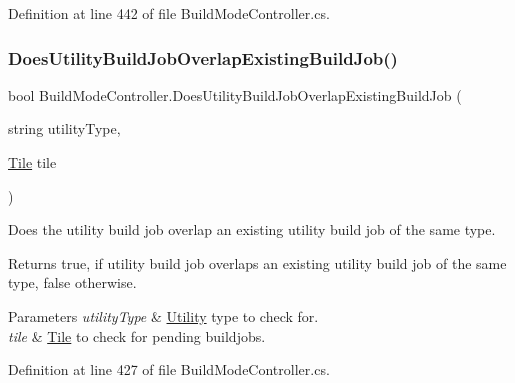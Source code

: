 Definition at line 442 of file Build\+Mode\+Controller.\+cs.

\mbox{\label{class_build_mode_controller_a701cb5c8326af048f78a511cf7c1c190}} 
\subsubsection{\texorpdfstring{Does\+Utility\+Build\+Job\+Overlap\+Existing\+Build\+Job()}{DoesUtilityBuildJobOverlapExistingBuildJob()}}
{\footnotesize\ttfamily bool Build\+Mode\+Controller.\+Does\+Utility\+Build\+Job\+Overlap\+Existing\+Build\+Job (\begin{DoxyParamCaption}\item[{string}]{utility\+Type,  }\item[{\hyperlink{class_tile}{Tile}}]{tile }\end{DoxyParamCaption})}



Does the utility build job overlap an existing utility build job of the same type. 

\begin{DoxyReturn}{Returns}
{\ttfamily true}, if utility build job overlaps an existing utility build job of the same type, {\ttfamily false} otherwise.
\end{DoxyReturn}

\begin{DoxyParams}{Parameters}
{\em utility\+Type} & \hyperlink{class_utility}{Utility} type to check for.\\
\hline
{\em tile} & \hyperlink{class_tile}{Tile} to check for pending buildjobs.\\
\hline
\end{DoxyParams}


Definition at line 427 of file Build\+Mode\+Controller.\+cs.

\mbox{\label{class_build_mode_controller_a43ac9aa9dbe863ce1072848d095ed6d5}} 
